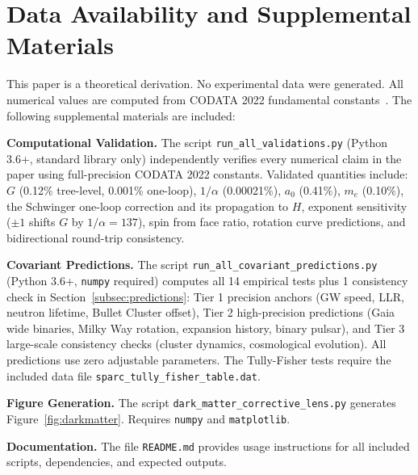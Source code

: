 \documentclass[aps,prd,preprint,superscriptaddress,showpacs,preprintnumbers,amsmath,amssymb,nofootinbib]{revtex4-2}
\begin{document}
\section*{Data Availability and Supplemental Materials}

This paper is a theoretical derivation. No experimental data were generated. All numerical values are computed from CODATA 2022 fundamental constants~\cite{codata2022}. The following supplemental materials are included:

\textbf{Computational Validation.}\quad
The script \texttt{run\_all\_validations.py} (Python 3.6+, standard library only) independently verifies every numerical claim in the paper using full-precision CODATA 2022 constants. Validated quantities include: $G$ (0.12\% tree-level, 0.001\% one-loop), $1/\alpha$ (0.00021\%), $a_0$ (0.41\%), $m_e$ (0.10\%), the Schwinger one-loop correction and its propagation to $H$, exponent sensitivity ($\pm 1$ shifts $G$ by $1/\alpha = 137$), spin from face ratio, rotation curve predictions, and bidirectional round-trip consistency.

\textbf{Covariant Predictions.}\quad
The script \texttt{run\_all\_covariant\_predictions.py} (Python 3.6+, \texttt{numpy} required) computes all 14 empirical tests plus 1 consistency check in Section~\ref{subsec:predictions}: Tier 1 precision anchors (GW speed, LLR, neutron lifetime, Bullet Cluster offset), Tier 2 high-precision predictions (Gaia wide binaries, Milky Way rotation, expansion history, binary pulsar), and Tier 3 large-scale consistency checks (cluster dynamics, cosmological evolution). All predictions use zero adjustable parameters. The Tully-Fisher tests require the included data file \texttt{sparc\_tully\_fisher\_table.dat}.

\textbf{Figure Generation.}\quad
The script \texttt{dark\_matter\_corrective\_lens.py} generates Figure~\ref{fig:darkmatter}. Requires \texttt{numpy} and \texttt{matplotlib}.

\textbf{Documentation.}\quad
The file \texttt{README.md} provides usage instructions for all included scripts, dependencies, and expected outputs.
\end{document}
